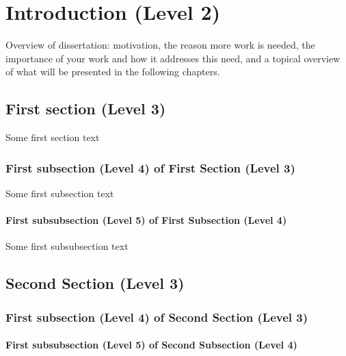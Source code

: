 \chapter[Intro]{Introduction (Level 2)}\label{chap:intro}

Overview of dissertation: motivation, the reason more work is needed, the importance of your work and how it addresses this need, and a topical overview of what will be presented in the following chapters.

\section{First section (Level 3)}

Some first section text
\subsection{First subsection (Level 4) of First Section (Level 3)}

Some first subsection text
\subsubsection{First subsubsection (Level 5) of First Subsection (Level 4)}

Some first subsubsection text
\section{Second Section (Level 3)}
\subsection{First subsection (Level 4) of Second Section (Level 3)}
\subsubsection{First subsubsection (Level 5) of Second Subsection (Level 4)}
\endinput 